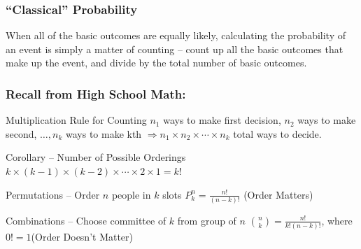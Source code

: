 \documentclass[handout]{beamer}
\begin{document}
\begin{frame}

\frametitle{``Classical'' Probability}

When all of the basic outcomes are equally likely, calculating the probability of an event is simply a matter of counting -- count up all the basic outcomes that make up the event, and divide by the total number of basic outcomes.

\end{frame}
\begin{frame}
\frametitle{Recall from High School Math:}

\begin{block}{Multiplication Rule for Counting}
$n_1$ ways to make first decision, $n_2$ ways to make second, $\hdots, n_k$ ways to make kth $\Rightarrow n_1 \times n_2 \times \cdots \times n_k$ total ways to decide. \end{block}
\begin{block}{Corollary -- Number of Possible Orderings}
$k \times(k-1)\times (k-2) \times \cdots\times  2 \times 1 = k!$
\end{block}

\begin{block}{Permutations -- Order $n$ people in $k$ slots}
$P_k^n = \frac{n!}{(n-k)!}$ \hfill \alert{(Order Matters)}\end{block}

\begin{block}{Combinations -- Choose committee of $k$ from group of $n$}
${n \choose k} = \frac{n!}{k! (n-k)!}$, where $0! = 1$\hfill \alert{(Order Doesn't Matter)}\end{block}

\end{frame}
\end{document}
